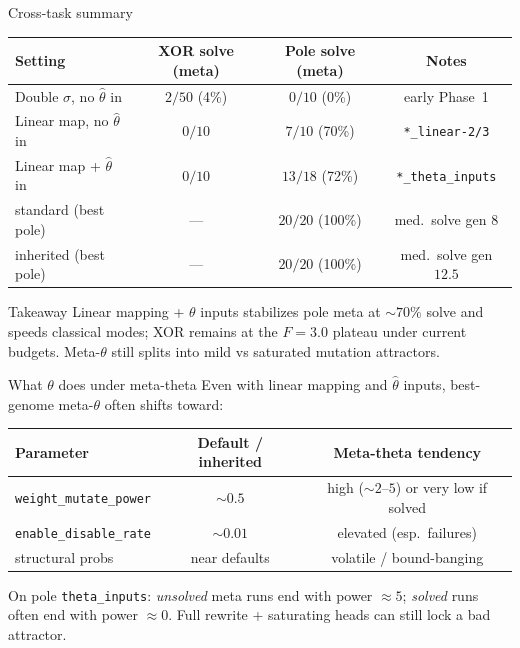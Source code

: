 \documentclass[aspectratio=169,11pt]{beamer}
\begin{document}
\begin{frame}{Cross-task summary}
  \small
  \begin{center}
  \begin{tabular}{lccc}
    \toprule
    Setting & XOR solve (meta) & Pole solve (meta) & Notes \\
    \midrule
    Double $\sigma$, no $\hat\theta$ in & $2/50$ (4\%) & $0/10$ (0\%) & early Phase~1 \\
    Linear map, no $\hat\theta$ in & $0/10$ & $7/10$ (70\%) & \texttt{*\_linear-2/3} \\
    Linear map + $\hat\theta$ in & $0/10$ & $13/18$ (72\%) & \texttt{*\_theta\_inputs} \\
    \midrule
    standard (best pole) & --- & $20/20$ (100\%) & med.\ solve gen $8$ \\
    inherited (best pole) & --- & $20/20$ (100\%) & med.\ solve gen $12.5$ \\
    \bottomrule
  \end{tabular}
  \end{center}

  \vspace{0.6em}
  \begin{block}{Takeaway}
    Linear mapping + $\theta$ inputs stabilizes pole meta at $\sim 70\%$ solve and
    speeds classical modes; XOR remains at the $F=3.0$ plateau under current budgets.
    Meta-$\theta$ still splits into mild vs saturated mutation attractors.
  \end{block}
\end{frame}

\begin{frame}{What $\theta$ does under meta-theta}
  Even with linear mapping and $\hat\theta$ inputs, best-genome meta-$\theta$ often shifts toward:

  \begin{center}
  \begin{tabular}{lcc}
    \toprule
    Parameter & Default / inherited & Meta-theta tendency \\
    \midrule
    \texttt{weight\_mutate\_power} & $\sim 0.5$ & high ($\sim 2$--$5$) or very low if solved \\
    \texttt{enable\_disable\_rate} & $\sim 0.01$ & elevated (esp.\ failures) \\
    structural probs & near defaults & volatile / bound-banging \\
    \bottomrule
  \end{tabular}
  \end{center}

  \vspace{0.6em}
  On pole \texttt{theta\_inputs}: \emph{unsolved} meta runs end with power $\approx 5$;
  \emph{solved} runs often end with power $\approx 0$.
  Full rewrite + saturating heads can still lock a bad attractor.
\end{frame}
\end{document}
